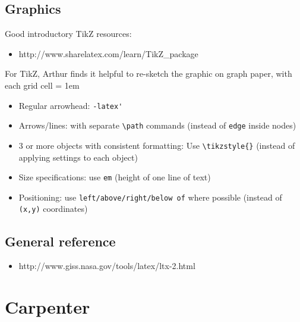 \subsection{Graphics}

Good introductory TikZ resources:
\begin{itemize}
\item http://www.sharelatex.com/learn/TikZ\_package
\end{itemize}

For TikZ, Arthur finds it helpful to re-sketch the graphic on graph paper, with each grid cell = 1em
\begin{itemize}
\item Regular arrowhead: \verb+-latex'+
\item Arrows/lines: with separate \verb+\path+ commands (instead of \verb+edge+ inside nodes) 
\item 3 or more objects with consistent formatting: Use \verb+\tikzstyle{}+ (instead of applying settings to each object)
\item Size specifications: use \verb+em+ (height of one line of text)
\item Positioning: use \verb+left/above/right/below of+ where possible (instead of \verb+(x,y)+ coordinates)
\end{itemize}

\subsection{General reference}
\begin{itemize}
\item http://www.giss.nasa.gov/tools/latex/ltx-2.html
\end{itemize}

\section{Carpenter}

